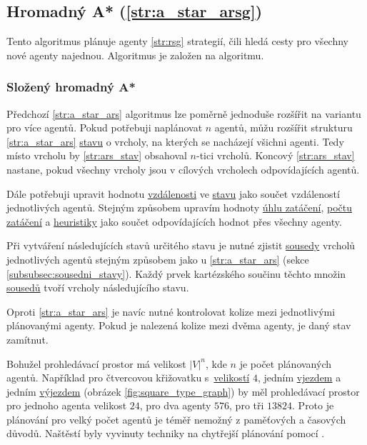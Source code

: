 \subsection{Hromadný A* (\ref{str:a_star_arsg})}\label{subsec:hromadny_a_star}


Tento algoritmus plánuje agenty \ref{str:rsg} strategií, čili hledá cesty pro všechny nové agenty najednou.
Algoritmus je založen na  algoritmu.

\subsubsection{Složený hromadný A*}\label{subsubsec:arsg_slozeny_hromadny}
Předchozí \ref{str:a_star_ars} algoritmus lze poměrně jednoduše rozšířit na variantu pro více agentů.
Pokud potřebuji naplánovat $n$ agentů, můžu rozšířit strukturu \ref{str:a_star_ars}
\hyperref[str:ars_stav]{stavu} o vrcholy, na kterých se nacházejí všichni agenti.
Tedy místo vrcholu by \ref{str:ars_stav} obsahoval $n$-tici vrcholů.
Koncový \ref{str:ars_stav} nastane, pokud všechny vrcholy jsou v cílových vrcholech odpovídajících agentů.

Dále potřebuji upravit hodnotu \hyperref[par:ars_vzdalenost]{vzdálenosti} ve \hyperref[str:ars_stav]{stavu}
jako součet vzdáleností jednotlivých agentů.
Stejným způsobem upravím hodnoty \hyperref[par:ars_uhel_zataceni]{úhlu zatáčení},
\hyperref[par:ars_pocet_zataceni]{počtu zatáčení} a \hyperref[par:ars_heuristika]{heuristiky} jako součet
odpovídajících hodnot přes všechny agenty.

Při vytváření následujících stavů určitého stavu je nutné zjistit \hyperref[str:ars_sousedi]{sousedy} vrcholů
jednotlivých agentů stejným způsobem jako u \ref{str:a_star_ars} (sekce \ref{subsubsec:sousedni_stavy}).
Každý prvek kartézského součinu těchto množin \hyperref[str:ars_sousedi]{sousedů} tvoří vrcholy následujícího stavu.

Oproti \ref{str:a_star_ars} je navíc nutné kontrolovat kolize mezi jednotlivými plánovanými agenty.
Pokud je nalezená kolize mezi dvěma agenty, je daný stav zamítnut.

Bohužel prohledávací prostor má velikost $|V|^n$, kde $n$ je počet plánovaných agentů.
Například pro čtvercovou křižovatku s~\hyperref[par:velikost_krizovatky]{velikostí} $4$,
jedním \hyperref[par:vjezdy]{vjezdem} a jedním \hyperref[par:vyjezdy]{výjezdem} (obrázek \ref{fig:square_type_graph})
by měl prohledávací prostor pro jednoho agenta velikost $24$, pro dva agenty $576$, pro tři $13824$.
Proto je plánování pro velký počet agentů je téměř nemožný z paměťových a časových důvodů.
Naštěstí byly vyvinuty techniky na chytřejší plánování pomocí .

